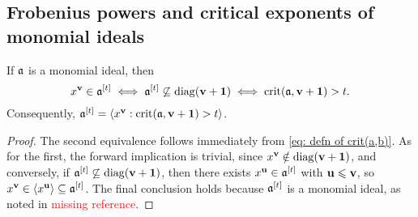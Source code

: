 \documentclass[11pt]{amsart}
\begin{document}
{\subsection{Frobenius powers and critical exponents of monomial ideals}

% 
% 

\begin{proposition}\label{prop: description of frobenius powers in terms of crits}
   If $\mathfrak{a}$ is a monomial ideal, then
   \[ x^{\mathbf{v}} \in \mathfrak{a}^{[t]} \iff \mathfrak{a}^{[t]} \not \subseteq \operatorname{diag}(\mathbf{v}+\mathbf{1}) \iff \operatorname{crit}(\mathfrak{a}, \mathbf{v}+\mathbf{1}) > t.\]
   Consequently, $\mathfrak{a}^{[t]} = \langle x^{\mathbf{v}} : \operatorname{crit}(\mathfrak{a}, \mathbf{v}+\mathbf{1}) > t \rangle$.
\end{proposition}

\begin{proof}
   The second equivalence follows immediately from \eqref{eq: defn of crit(a,b)}.
   As for the first, the forward implication is trivial, since $x^{\mathbf{v}} \notin\operatorname{diag}(\mathbf{v}+\mathbf{1})$, and conversely, if $\mathfrak{a}^{[t]} \not \subseteq \operatorname{diag}(\mathbf{v}+\mathbf{1})$, then there exists $x^{\mathbf{u}} \in \mathfrak{a}^{[t]}$ with $\mathbf{u} \leqslant \mathbf{v}$, so $x^{\mathbf{v}}\in \langle x^{\mathbf{u}} \rangle \subseteq \mathfrak{a}^{[t]}$.
   The final conclusion holds because $\mathfrak{a}^{[t]}$ is a monomial ideal, as noted in \textcolor{red}{missing reference}.
\end{proof}

}
\end{document}
